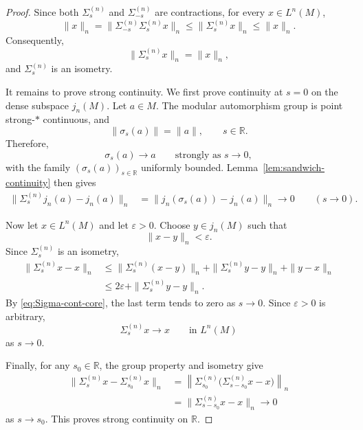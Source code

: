 \documentclass[11pt,a4paper]{article}
\theoremstyle{plain}
\numberwithin{theorem}{section}
\theoremstyle{definition}
\newcommand{\?}{\overset{?}{=}}
\begin{document}
\begin{appendix}
\begin{proof}
Since both \(\Sigma_s^{(n)}\) and \(\Sigma_{-s}^{(n)}\) are contractions,
for every \(x\in L^n(M)\),
\[
        \|x\|_n
        =
        \|\Sigma_{-s}^{(n)}\Sigma_s^{(n)}x\|_n
        \leq
        \|\Sigma_s^{(n)}x\|_n
        \leq
        \|x\|_n.
\]
Consequently,
\[
        \|\Sigma_s^{(n)}x\|_n=\|x\|_n,
\]
and \(\Sigma_s^{(n)}\) is an isometry.

It remains to prove strong continuity.  We first prove continuity at
\(s=0\) on the dense subspace \(j_n(M)\).  Let \(a\in M\).  The modular
automorphism group is point strong-\(*\) continuous, and
\[
        \|\sigma_s(a)\|=\|a\|,
        \qquad s\in\mathbb R.
\]
Therefore,
\[
        \sigma_s(a)\longrightarrow a
        \qquad\text{strongly as }s\to0,
\]
with the family \((\sigma_s(a))_{s\in\mathbb R}\) uniformly bounded.
Lemma~\ref{lem:sandwich-continuity} then gives
\begin{equation}
\label{eq:Sigma-cont-core}
\begin{aligned}
        \|\Sigma_s^{(n)}j_n(a)-j_n(a)\|_n
        &=
        \|j_n(\sigma_s(a))-j_n(a)\|_n
        \longrightarrow0
        \qquad (s\to0).
\end{aligned}
\end{equation}

Now let \(x\in L^n(M)\) and let \(\varepsilon>0\).  Choose
\(y\in j_n(M)\) such that
\[
        \|x-y\|_n<\varepsilon.
\]
Since \(\Sigma_s^{(n)}\) is an isometry,
\[
\begin{aligned}
        \|\Sigma_s^{(n)}x-x\|_n
        &\leq
        \|\Sigma_s^{(n)}(x-y)\|_n
        +
        \|\Sigma_s^{(n)}y-y\|_n
        +
        \|y-x\|_n                                    \\
        &\leq
        2\varepsilon
        +
        \|\Sigma_s^{(n)}y-y\|_n.
\end{aligned}
\]
By \eqref{eq:Sigma-cont-core}, the last term tends to zero as \(s\to0\).
Since \(\varepsilon>0\) is arbitrary,
\[
        \Sigma_s^{(n)}x\longrightarrow x
        \qquad\text{in }L^n(M)
\]
as \(s\to0\).

Finally, for any \(s_0\in\mathbb R\), the group property and isometry give
\[
\begin{aligned}
        \|\Sigma_s^{(n)}x-\Sigma_{s_0}^{(n)}x\|_n
        &=
        \left\|
        \Sigma_{s_0}^{(n)}
        \bigl(\Sigma_{s-s_0}^{(n)}x-x\bigr)
        \right\|_n                                   \\
        &=
        \|\Sigma_{s-s_0}^{(n)}x-x\|_n
        \longrightarrow0
\end{aligned}
\]
as \(s\to s_0\).  This proves strong continuity on \(\mathbb R\).
\end{proof}



\end{appendix}
\end{document}
